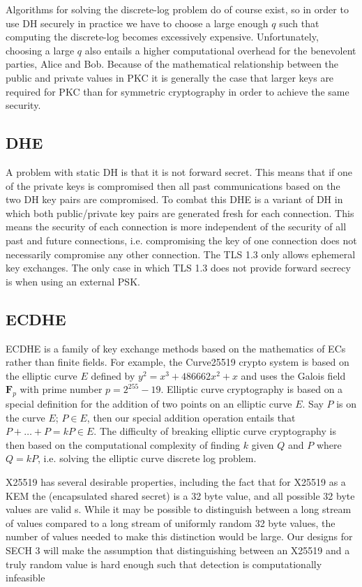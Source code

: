 Algorithms for solving the discrete-log problem do of course exist, so in order to use \ac{DH} securely in practice we have to choose a large enough $q$ such that computing the discrete-log becomes excessively expensive.
Unfortunately, choosing a large $q$ also entails a higher computational overhead for the benevolent parties, Alice and Bob.
Because of the mathematical relationship between the public and private values in \ac{PKC} it is generally the case that larger keys are required for \ac{PKC} than for symmetric cryptography in order to achieve the same security.

\subsection{DHE}
A problem with static \ac{DH} is that it is not forward secret. This means
that if one of the private keys is compromised then all past communications
based on the two \ac{DH} key pairs are compromised.
To combat this \ac{DHE} is a variant of \ac{DH} in which both public/private key pairs
are generated fresh for each connection. This means the security of each connection is more independent of the security of all past and future connections, i.e. compromising
the key of one connection does not necessarily compromise any other connection.
The \ac{TLS} 1.3 only allows ephemeral key exchanges. The only case in which \ac{TLS} 1.3 does not provide forward secrecy is when using an external \ac{PSK}.

\subsection{ECDHE}
\ac{EC}\ac{DHE} is a family of key exchange methods based on the mathematics of \acp{EC}
rather than finite fields.
For example, the Curve25519 crypto system is based on the elliptic curve $E$ defined by
$y^2=x^3+486662x^2+x$ and uses the Galois field $\mathbf{F}_p$ with prime number $p=2^{255}-19$.
Elliptic curve cryptography is based on a special definition for the addition
of two points on an elliptic curve $E$.
Say $P$ is on the curve $E$; $P\in E$,
then our special addition operation entails that $P+\ldots+P=kP\in E$. 
The difficulty of breaking elliptic curve cryptography is then based on
the computational complexity of finding $k$ given $Q$ and $P$ where $Q=kP$,
i.e. solving the elliptic curve discrete log problem.

\ac{X25519} has several desirable properties,
including the fact that for \ac{X25519} as a \ac{KEM} the  (encapsulated shared secret) is a 32 byte value,
and all possible 32 byte values are valid s.
While it may be possible to distinguish between a long stream of  values compared to a long stream of uniformly random 32 byte values,
the number of values needed to make this distinction would be large.
Our designs for \ac{SECH} 3 will make the assumption that
distinguishing between an \ac{X25519}  and a truly random
value is hard enough such that detection is computationally infeasible

